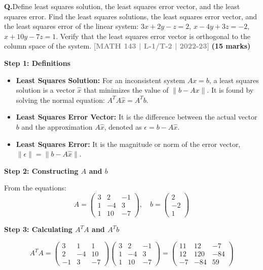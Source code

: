 \documentclass[12pt,a3paper]{article}
\newcommand{\yr}[1]{\hfill\textcolor{gray}{\small\textbf{[#1]}}}
\newcommand{\mk}[1]{\textcolor{orange!70!black}{\small\textbf{(#1 marks)}}}
\newcounter{qnum}
\newcommand{\Q}[1]{%
  \needspace{4\baselineskip}
  \refstepcounter{qnum}
  \vspace{6pt}
  \noindent\textbf{Q\theqnum.}\enspace #1\par
}
\begin{document}
\Q{Define least squares solution, the least squares error vector, and the least squares error. Find the least squares solutions, the least squares error vector, and the least squares error of the linear system:
$3x + 2y - z = 2$, \quad $x - 4y + 3z = -2$, \quad $x + 10y - 7z = 1$.
Verify that the least squares error vector is orthogonal to the column space of the system.
\yr{MATH 143 | L-1/T-2 | 2022-23} \mk{15}}
\begin{tcolorbox}[enhanced,breakable,
  colback=cB!4,colframe=cB,boxrule=0.8pt,arc=5pt,
  title={\textbf{Answer --- Least Squares Analysis}},
  fonttitle=\bfseries\color{white},colbacktitle=cB]

\textbf{Step 1: Definitions}

\begin{itemize}
    \item \textbf{Least Squares Solution:} For an inconsistent system $Ax = b$, a least squares solution is a vector $\hat{x}$ that minimizes the value of $\|b - Ax\|$. It is found by solving the normal equation: $A^T A \hat{x} = A^T b$.
    \item \textbf{Least Squares Error Vector:} It is the difference between the actual vector $b$ and the approximation $A\hat{x}$, denoted as $\epsilon = b - A\hat{x}$.
    \item \textbf{Least Squares Error:} It is the magnitude or norm of the error vector, $\|\epsilon\| = \|b - A\hat{x}\|$.
\end{itemize}

\medskip
\textbf{Step 2: Constructing $A$ and $b$}

From the equations:
$$A = \begin{pmatrix} 3 & 2 & -1 \\ 1 & -4 & 3 \\ 1 & 10 & -7 \end{pmatrix}, \quad b = \begin{pmatrix} 2 \\ -2 \\ 1 \end{pmatrix}$$

\medskip
\textbf{Step 3: Calculating $A^T A$ and $A^T b$}

$$A^T A = \begin{pmatrix} 3 & 1 & 1 \\ 2 & -4 & 10 \\ -1 & 3 & -7 \end{pmatrix} \begin{pmatrix} 3 & 2 & -1 \\ 1 & -4 & 3 \\ 1 & 10 & -7 \end{pmatrix} = \begin{pmatrix} 11 & 12 & -7 \\ 12 & 120 & -84 \\ -7 & -84 & 59 \end{pmatrix}$$


\end{tcolorbox}
\end{document}
